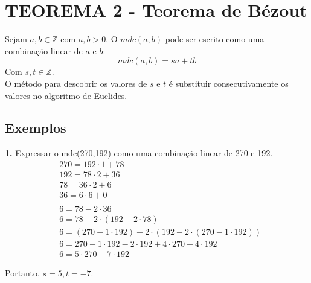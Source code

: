 \section{TEOREMA 2 - Teorema de Bézout}
Sejam $a, b \in \mathbb{Z}$ com $a,b > 0$. O $mdc(a,b)$ pode ser escrito como uma combinação linear de $a$ e $b$:
\[
    mdc(a,b) = sa + tb
\]
Com $s,t \in \mathbb{Z}$.\\
O método para descobrir os valores de $s$ e $t$ é substituir consecutivamente os valores no algoritmo de Euclides.

\subsection*{Exemplos}
\textbf{1.} Expressar o mdc(270,192) como uma combinação linear de 270 e 192.
\begin{align*}
     & 270 = 192 \cdot 1 + 78                                                \\
     & 192 = 78 \cdot 2 + 36                                                 \\
     & 78 = 36 \cdot 2 + 6                                                   \\
     & 36 = 6 \cdot 6 + 0                                                    \\
    \\
     & 6 = 78 - 2 \cdot 36                                                   \\
     & 6 = 78 - 2 \cdot (192 - 2 \cdot 78)                                   \\
     & 6 = (270 - 1 \cdot 192) - 2 \cdot (192 - 2 \cdot (270 - 1 \cdot 192)) \\
     & 6 = 270 -  1 \cdot 192 - 2 \cdot 192 + 4 \cdot 270 - 4 \cdot 192      \\
     & 6 = 5 \cdot 270 - 7 \cdot 192
\end{align*}
\par Portanto, $s = 5, t = -7$.